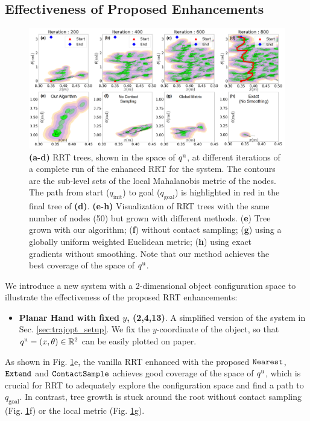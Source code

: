 \subsection{Effectiveness of Proposed Enhancements \label{sec:rrt_contact_effectiveness}}

\begin{figure}
\centering\includegraphics[width = 1.0\textwidth]{figures/03_contact_rich_planning/iteration_plot_combined_horizontal.png}
\caption{\textbf{(a-d)} RRT trees, shown in the space of $\qu$, at different iterations of a complete run of the enhanced RRT for the  system. The contours are the sub-level sets of the local Mahalanobis metric of the nodes. The path from start ($q_\mathrm{init}$) to goal ($q_\mathrm{goal}$) is highlighted in red in the final tree of \textbf{(d)}. \textbf{(e-h)} Visualization of RRT trees with the same number of nodes (50) but grown with different methods. (\textbf{e}) Tree grown with our algorithm; (\textbf{f}) without contact sampling; (\textbf{g}) using a globally uniform weighted Euclidean metric; (\textbf{h}) using exact gradients without smoothing. Note that our method achieves the best coverage of the space of $\qu$.}
\label{fig:degenerate}
\end{figure}

We introduce a new system with a 2-dimensional object configuration space to illustrate the effectiveness of the proposed RRT enhancements:
\begin{itemize}
\item {\bf Planar Hand with fixed $y$, (2,4,13)}. A simplified version of the  system in Sec. \ref{sec:trajopt_setup}. We fix the $y$-coordinate of the object, so that $\qu = (x, \theta)\in \R[2]$ can be easily plotted on paper. 
\end{itemize}

As shown in Fig. \ref{fig:degenerate}e, the vanilla RRT enhanced with the proposed $\Nearest$, $\Extend$ and $\ContactSample$ achieves good coverage of the space of $\qu$, which is crucial for RRT to adequately explore the configuration space and find a path to $q_\mathrm{goal}$. In contrast, tree growth is stuck around the root without contact sampling (Fig. \ref{fig:degenerate}f) or the local metric (Fig. \ref{fig:degenerate}g).

